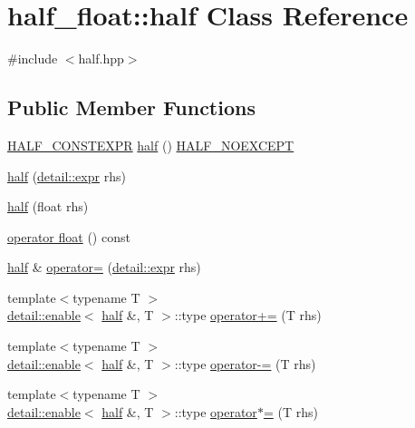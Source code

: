 \hypertarget{classhalf__float_1_1half}{}\section{half\+\_\+float\+:\+:half Class Reference}
\label{classhalf__float_1_1half}


{\ttfamily \#include $<$half.\+hpp$>$}

\subsection*{Public Member Functions}
\begin{DoxyCompactItemize}
\item 
\hyperlink{half_8hpp_ace3116a3e2cd66dd15780b92060987c7}{H\+A\+L\+F\+\_\+\+C\+O\+N\+S\+T\+E\+X\+PR} \hyperlink{classhalf__float_1_1half_a3f52e869fec499d6b86f2afc90749d6a}{half} () \hyperlink{half_8hpp_a04e7940852b33adbb81a8249fef1c508}{H\+A\+L\+F\+\_\+\+N\+O\+E\+X\+C\+E\+PT}
\item 
\hyperlink{classhalf__float_1_1half_ab56421622ebddd86fc75ad1eebdfbd8e}{half} (\hyperlink{structhalf__float_1_1detail_1_1expr}{detail\+::expr} rhs)
\item 
\hyperlink{classhalf__float_1_1half_aad7fddc333853c6a37016e2eac3d4d04}{half} (float rhs)
\item 
\hyperlink{classhalf__float_1_1half_ac44a6dc499322ae9330375f2b0dda8b6}{operator float} () const
\item 
\hyperlink{classhalf__float_1_1half}{half} \& \hyperlink{classhalf__float_1_1half_ada563d2964479ed1a325eca97933dc9f}{operator=} (\hyperlink{structhalf__float_1_1detail_1_1expr}{detail\+::expr} rhs)
\item 
{\footnotesize template$<$typename T $>$ }\\\hyperlink{structhalf__float_1_1detail_1_1enable}{detail\+::enable}$<$ \hyperlink{classhalf__float_1_1half}{half} \&, T $>$\+::type \hyperlink{classhalf__float_1_1half_aa562db3abdbf9c0bca4150f7cfa6bd1b}{operator+=} (T rhs)
\item 
{\footnotesize template$<$typename T $>$ }\\\hyperlink{structhalf__float_1_1detail_1_1enable}{detail\+::enable}$<$ \hyperlink{classhalf__float_1_1half}{half} \&, T $>$\+::type \hyperlink{classhalf__float_1_1half_a86647595e63e3d0bac1c4b17a3fe162e}{operator-\/=} (T rhs)
\item 
{\footnotesize template$<$typename T $>$ }\\\hyperlink{structhalf__float_1_1detail_1_1enable}{detail\+::enable}$<$ \hyperlink{classhalf__float_1_1half}{half} \&, T $>$\+::type \hyperlink{classhalf__float_1_1half_a6de077e98651981a899b09738e49d3c3}{operator$\ast$=} (T rhs)

\end{DoxyCompactItemize}
